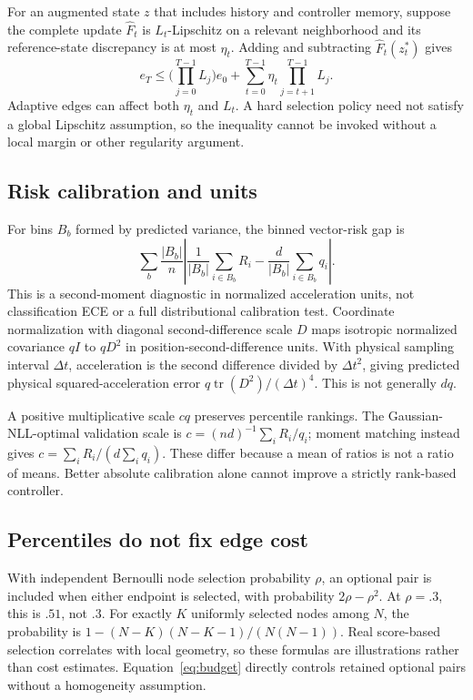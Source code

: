 For an augmented state $z$ that includes history and controller memory, suppose the complete update $\widehat F_t$ is $L_t$-Lipschitz on a relevant neighborhood and its reference-state discrepancy is at most $\eta_t$. Adding and subtracting $\widehat F_t(z_t^*)$ gives
\begin{equation}
 e_T\le\Big(\prod_{j=0}^{T-1}L_j\Big)e_0+
 \sum_{t=0}^{T-1}\eta_t\prod_{j=t+1}^{T-1}L_j.
\end{equation}
Adaptive edges can affect both $\eta_t$ and $L_t$. A hard selection policy need not satisfy a global Lipschitz assumption, so the inequality cannot be invoked without a local margin or other regularity argument.

\subsection{Risk calibration and units}
For bins $B_b$ formed by predicted variance, the binned vector-risk gap is
\begin{equation}
 \sum_b\frac{|B_b|}{n}\left|
 \frac{1}{|B_b|}\sum_{i\in B_b}R_i
 -\frac{d}{|B_b|}\sum_{i\in B_b}q_i\right|.
\end{equation}
This is a second-moment diagnostic in normalized acceleration units, not classification ECE or a full distributional calibration test. Coordinate normalization with diagonal second-difference scale $D$ maps isotropic normalized covariance $qI$ to $qD^2$ in position-second-difference units. With physical sampling interval $\Delta t$, acceleration is the second difference divided by $\Delta t^2$, giving predicted physical squared-acceleration error $q\operatorname{tr}(D^2)/(\Delta t)^4$. This is not generally $dq$.

A positive multiplicative scale $cq$ preserves percentile rankings. The Gaussian-NLL-optimal validation scale is $c=(nd)^{-1}\sum_iR_i/q_i$; moment matching instead gives $c=\sum_iR_i/(d\sum_iq_i)$. These differ because a mean of ratios is not a ratio of means. Better absolute calibration alone cannot improve a strictly rank-based controller.

\subsection{Percentiles do not fix edge cost}
With independent Bernoulli node selection probability $\rho$, an optional pair is included when either endpoint is selected, with probability $2\rho-\rho^2$. At $\rho=.3$, this is $.51$, not $.3$. For exactly $K$ uniformly selected nodes among $N$, the probability is $1-(N-K)(N-K-1)/(N(N-1))$. Real score-based selection correlates with local geometry, so these formulas are illustrations rather than cost estimates. Equation~\ref{eq:budget} directly controls retained optional pairs without a homogeneity assumption.

